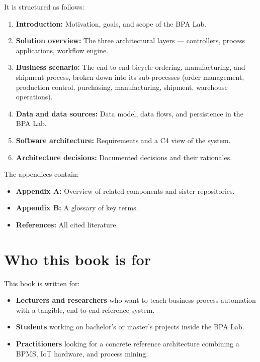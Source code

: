 \documentclass[
  english,
  11pt,
  a4paper,
]{scrbook}
\providecommand{\tightlist}{%
  \setlength{\itemsep}{0pt}\setlength{\parskip}{0pt}}
\begin{document}
It is structured as follows:

\begin{enumerate}
\def\labelenumi{\arabic{enumi}.}
\tightlist
\item
  \textbf{Introduction:} Motivation, goals, and scope of the BPA Lab.
\item
  \textbf{Solution overview:} The three architectural layers ---
  controllers, process applications, workflow engine.
\item
  \textbf{Business scenario:} The end-to-end bicycle ordering,
  manufacturing, and shipment process, broken down into its
  sub-processes (order management, production control, purchasing,
  manufacturing, shipment, warehouse operations).
\item
  \textbf{Data and data sources:} Data model, data flows, and
  persistence in the BPA Lab.
\item
  \textbf{Software architecture:} Requirements and a C4 view of the
  system.
\item
  \textbf{Architecture decisions:} Documented decisions and their
  rationales.
\end{enumerate}

The appendices contain:

\begin{itemize}
\tightlist
\item
  \textbf{Appendix A:} Overview of related components and sister
  repositories.
\item
  \textbf{Appendix B:} A glossary of key terms.
\item
  \textbf{References:} All cited literature.
\end{itemize}

\section{Who this book is for}\label{who-this-book-is-for}

This book is written for:

\begin{itemize}
\tightlist
\item
  \textbf{Lecturers and researchers} who want to teach business process
  automation with a tangible, end-to-end reference system.
\item
  \textbf{Students} working on bachelor's or master's projects inside
  the BPA Lab.
\item
  \textbf{Practitioners} looking for a concrete reference architecture
  combining a BPMS, IoT hardware, and process mining.
\end{itemize}
\end{document}
